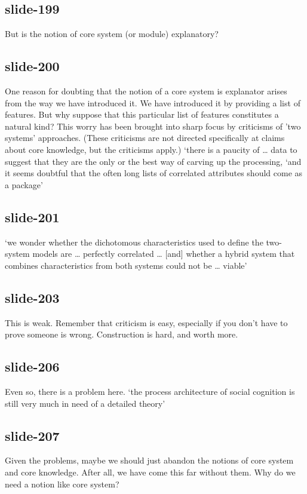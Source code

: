 \documentclass[12pt,\papersize]{extarticle}
\begin{document}
 
\subsection{slide-199}
But is the notion of core system (or module) explanatory?
 
 
\subsection{slide-200}
One reason for doubting that the notion of a core system is explanator arises from the way we have introduced it. We have introduced it by providing a list of features. But why suppose that this particular list of features constitutes a natural kind? This worry has been brought into sharp focus by criticisms of 'two systems' approaches. (These criticisms are not directed specifically at claims about core knowledge, but the criticisms apply.)
‘there is a paucity of … data to suggest that they are the only or the best way of carving up the processing,
‘and it seems doubtful that the often long lists of correlated attributes should come as a package’
\citep[p.\ 759]{adolphs_conceptual_2010}
 
 
\subsection{slide-201}
‘we wonder whether the dichotomous characteristics used to define the two-system models are … perfectly correlated …
[and] whether a hybrid system that combines characteristics from both systems could not be … viable’
\citep[p.\ 537]{keren_two_2009}
 
 
\subsection{slide-203}
This is weak.
Remember that criticism is easy, especially if you don't have to prove someone is wrong.
Construction is hard, and worth more.
 
 
\subsection{slide-206}
Even so, there is a problem here.
‘the process architecture of social cognition is still very much in need of a detailed theory’
\citep[p.\ 759]{adolphs_conceptual_2010}
 
 
\subsection{slide-207}
Given the problems, maybe we should just abandon the notions of core system and core knowledge. After all, we have come this far without them.
Why do we need a notion like core system?
 
\end{document}
